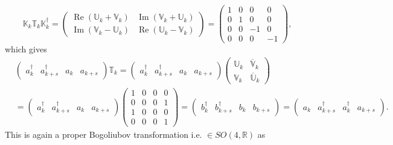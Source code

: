 \documentclass[aps, preprint]{revtex4}
\begin{document}
\begin{equation}\mathbb{K}_{k} \mathbb{T}_{k} \mathbb{K}_{k}^{ \dag } =\left (\begin{array}{cc}\ensuremath{\operatorname*{Re}} \left (\mathbb{U}_{k} +\mathbb{V}_{k}\right ) & \ensuremath{\operatorname*{Im}} \left (\mathbb{V}_{k} +\mathbb{U}_{k}\right ) \\
\ensuremath{\operatorname*{Im}} \left (\mathbb{V}_{k} -\mathbb{U}_{k}\right ) & \ensuremath{\operatorname*{Re}} \left (\mathbb{U}_{k} -\mathbb{V}_{k}\right )\end{array}\right ) =\left (\begin{array}{cccc}1 & 0 & 0 & 0 \\
0 & 1 & 0 & 0 \\
0 & 0 &  -1 & 0 \\
0 & 0 & 0 &  -1\end{array}\right )\text{,}
\end{equation}which gives
\begin{align} & \left (\begin{array}{cccc}a_{k}^{ \dag } & a_{k +s}^{ \dag } & a_{k} & a_{k +s}\end{array}\right ) \mathbb{T}_{k} =\left (\begin{array}{cccc}a_{k}^{ \dag } & a_{k +s}^{ \dag } & a_{k} & a_{k +s}\end{array}\right ) \left (\begin{array}{cc}\mathbb{U}_{k} & \overline{\mathbb{V}}_{k} \\
\mathbb{V}_{k} & \overline{\mathbb{U}}_{k}\end{array}\right ) \nonumber  \\
 &  =\left (\begin{array}{cccc}a_{k}^{ \dag } & a_{k +s}^{ \dag } & a_{k} & a_{k +s}\end{array}\right ) \left (\begin{array}{cccc}1 & 0 & 0 & 0 \\
0 & 0 & 0 & 1 \\
1 & 0 & 0 & 0 \\
0 & 0 & 0 & 1\end{array}\right ) =\left (\begin{array}{cccc}b_{k}^{ \dag } & b_{k +s}^{ \dag } & b_{k} & b_{k +s}\end{array}\right ) =\left (\begin{array}{cccc}a_{k} & a_{k +s}^{ \dag } & a_{k}^{ \dag } & a_{k +s}\end{array}\right )\text{.}\end{align}This is again a proper Bogoliubov transformation i.e. $ \in S O \left (4 ,\mathbb{R}\right )$ as
\end{document}
